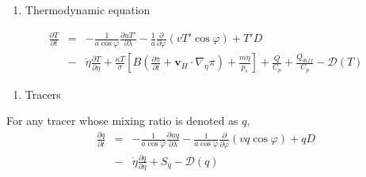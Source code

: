 \begin{enumerate}
\def\labelenumi{\arabic{enumi}.}
\setcounter{enumi}{3}
\tightlist
\item
  Thermodynamic equation
\end{enumerate}
\begin{eqnarray}
  \frac{\partial T}{\partial t}
     &=&  - \frac{1}{a\cos\varphi}
               \frac{\partial uT'}{\partial \lambda}
          - \frac{1}{a}
               \frac{\partial }{\partial \varphi} ( vT' \cos\varphi )
          + T' D \\
        &-& \dot{\eta} 
              \frac{\partial T }{\partial \eta}
          + \frac{\kappa T}{\sigma} \left[ B\left( \frac{\partial \pi}{\partial t}
                            + {\mathbf{v}}_{H} \cdot \nabla_{\eta}\pi \right)
                            + \frac{ m\dot{\eta} }{ p_s }
                     \right]
          + \frac{Q}{C_{p}}
          + \frac{Q_{diff}}{C_{p}}
          - {\mathcal D}(T) 
\end{eqnarray}

\begin{enumerate}
\def\labelenumi{\arabic{enumi}.}
\setcounter{enumi}{4}
\tightlist
\item
  Tracers
\end{enumerate}

For any tracer whose mixing ratio is denoted as \(q\),
\begin{eqnarray}
  \frac{\partial q}{\partial t}
   &=&  - \frac{1}{a\cos\varphi}
               \frac{\partial uq}{\partial \lambda}
          - \frac{1}{a\cos\varphi}
               \frac{\partial }{\partial \varphi} (vq \cos\varphi)
          + q D \\
        &-& \dot{\eta} \frac{\partial q }{\partial \eta}
          + S_{q}
          - {\mathcal D}(q) 
\end{eqnarray}

